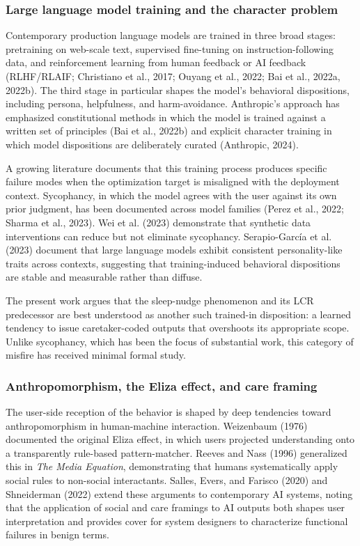 \documentclass[11pt]{article}
\begin{document}
\subsubsection{Large language model training and the character problem}

Contemporary production language models are trained in three broad stages: pretraining on web-scale text, supervised fine-tuning on instruction-following data, and reinforcement learning from human feedback or AI feedback (RLHF/RLAIF; Christiano et al., 2017; Ouyang et al., 2022; Bai et al., 2022a, 2022b). The third stage in particular shapes the model's behavioral dispositions, including persona, helpfulness, and harm-avoidance. Anthropic's approach has emphasized constitutional methods in which the model is trained against a written set of principles (Bai et al., 2022b) and explicit character training in which model dispositions are deliberately curated (Anthropic, 2024).

A growing literature documents that this training process produces specific failure modes when the optimization target is misaligned with the deployment context. Sycophancy, in which the model agrees with the user against its own prior judgment, has been documented across model families (Perez et al., 2022; Sharma et al., 2023). Wei et al. (2023) demonstrate that synthetic data interventions can reduce but not eliminate sycophancy. Serapio-García et al. (2023) document that large language models exhibit consistent personality-like traits across contexts, suggesting that training-induced behavioral dispositions are stable and measurable rather than diffuse.

The present work argues that the sleep-nudge phenomenon and its LCR predecessor are best understood as another such trained-in disposition: a learned tendency to issue caretaker-coded outputs that overshoots its appropriate scope. Unlike sycophancy, which has been the focus of substantial work, this category of misfire has received minimal formal study.

\subsubsection{Anthropomorphism, the Eliza effect, and care framing}

The user-side reception of the behavior is shaped by deep tendencies toward anthropomorphism in human-machine interaction. Weizenbaum (1976) documented the original Eliza effect, in which users projected understanding onto a transparently rule-based pattern-matcher. Reeves and Nass (1996) generalized this in \emph{The Media Equation}, demonstrating that humans systematically apply social rules to non-social interactants. Salles, Evers, and Farisco (2020) and Shneiderman (2022) extend these arguments to contemporary AI systems, noting that the application of social and care framings to AI outputs both shapes user interpretation and provides cover for system designers to characterize functional failures in benign terms.
\end{document}
